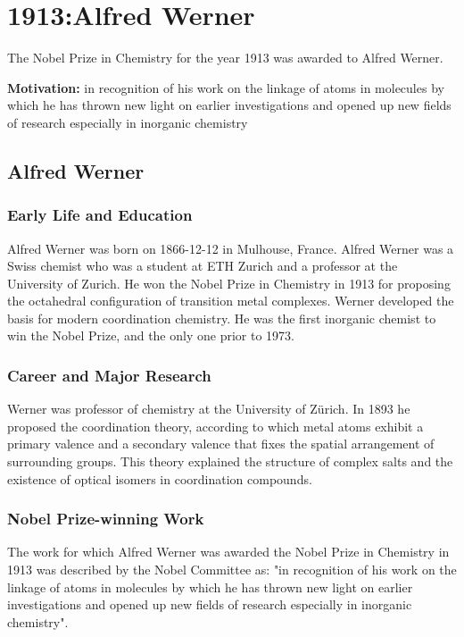 \chapter{1913:Alfred Werner}
\label{chap:chemistry1913}

The Nobel Prize in Chemistry for the year 1913 was awarded to Alfred Werner.

\textbf{Motivation:}
in recognition of his work on the linkage of atoms in molecules by which he has thrown new light on earlier investigations and opened up new fields of research especially in inorganic chemistry

\section{Alfred Werner}

\subsection*{Early Life and Education}

Alfred Werner was born on 1866-12-12 in Mulhouse, France.
Alfred Werner was a Swiss chemist who was a student at ETH Zurich and a professor at the University of Zurich. He won the Nobel Prize in Chemistry in 1913 for proposing the octahedral configuration of transition metal complexes. Werner developed the basis for modern coordination chemistry. He was the first inorganic chemist to win the Nobel Prize, and the only one prior to 1973.

\subsection*{Career and Major Research}

Werner was professor of chemistry at the University of Zürich. In 1893 he proposed the coordination theory, according to which metal atoms exhibit a primary valence and a secondary valence that fixes the spatial arrangement of surrounding groups. This theory explained the structure of complex salts and the existence of optical isomers in coordination compounds.

\subsection*{Nobel Prize-winning Work}

The work for which Alfred Werner was awarded the Nobel Prize in Chemistry in 1913 was described by the Nobel Committee as: "in recognition of his work on the linkage of atoms in molecules by which he has thrown new light on earlier investigations and opened up new fields of research especially in inorganic chemistry".

